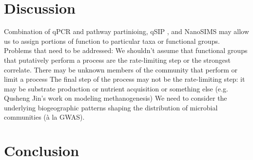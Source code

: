 \documentclass{article}
\begin{document}
\section{Discussion}
Combination of qPCR and pathway partinioing, qSIP \citep{hungate2015},
and NanoSIMS \citep{mayali2012} may allow us to assign portions of
function to particular taxa or functional groups.
Problems that need to be addressed: We shouldn’t assume that functional groups
that putatively perform a process are the rate-limiting step or the strongest
correlate.  There may be unknown members of the community that perform or limit
a process The final step of the process may not be the rate-limiting step: it
may be substrate production or nutrient acquisition or something else (e.g.
Qusheng Jin’s work on modeling methanogenesis) We need to consider the
underlying biogeographic patterns shaping the distribution of microbial
communities (à la GWAS). 

\section{Conclusion}
\end{document}
